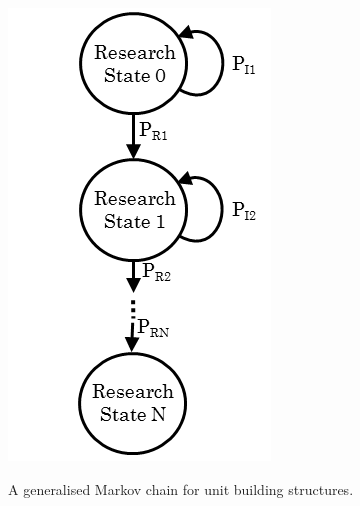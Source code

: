\begin{figure}[ht]
\centering
\includegraphics[scale=0.8, trim = 0cm 0cm 0cm 0.5cm]{diagrams/building_research}
\label{fig:struct_research}
\caption{A generalised Markov chain for unit building structures.}
\end{figure}